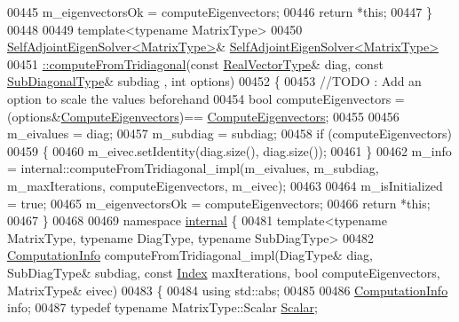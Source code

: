 \begin{DoxyCode}
00445   m\_eigenvectorsOk = computeEigenvectors;
00446   \textcolor{keywordflow}{return} *\textcolor{keyword}{this};
00447 \}
00448 
00449 \textcolor{keyword}{template}<\textcolor{keyword}{typename} MatrixType>
00450 \hyperlink{group___eigenvalues___module_class_eigen_1_1_self_adjoint_eigen_solver}{SelfAdjointEigenSolver<MatrixType>}& 
      \hyperlink{group___eigenvalues___module_a297893df7098c43278d385e4d4e23fe4}{SelfAdjointEigenSolver<MatrixType>}
00451 \hyperlink{group___eigenvalues___module_a297893df7098c43278d385e4d4e23fe4}{::computeFromTridiagonal}(\textcolor{keyword}{const} \hyperlink{class_eigen_1_1internal_1_1_tensor_lazy_evaluator_writable}{RealVectorType}& diag, \textcolor{keyword}{const} 
      \hyperlink{group___core___module_class_eigen_1_1_matrix}{SubDiagonalType}& subdiag , \textcolor{keywordtype}{int} options)
00452 \{
00453   \textcolor{comment}{//TODO : Add an option to scale the values beforehand}
00454   \textcolor{keywordtype}{bool} computeEigenvectors = (options&\hyperlink{group__enums_ggae3e239fb70022eb8747994cf5d68b4a9ada93d8885bde32b876ba4af01d3292cc}{ComputeEigenvectors})==
      \hyperlink{group__enums_ggae3e239fb70022eb8747994cf5d68b4a9ada93d8885bde32b876ba4af01d3292cc}{ComputeEigenvectors};
00455 
00456   m\_eivalues = diag;
00457   m\_subdiag = subdiag;
00458   \textcolor{keywordflow}{if} (computeEigenvectors)
00459   \{
00460     m\_eivec.setIdentity(diag.size(), diag.size());
00461   \}
00462   m\_info = internal::computeFromTridiagonal\_impl(m\_eivalues, m\_subdiag, m\_maxIterations, 
      computeEigenvectors, m\_eivec);
00463 
00464   m\_isInitialized = \textcolor{keyword}{true};
00465   m\_eigenvectorsOk = computeEigenvectors;
00466   \textcolor{keywordflow}{return} *\textcolor{keyword}{this};
00467 \}
00468 
00469 \textcolor{keyword}{namespace }\hyperlink{namespaceinternal}{internal} \{
00481 \textcolor{keyword}{template}<\textcolor{keyword}{typename} MatrixType, \textcolor{keyword}{typename} DiagType, \textcolor{keyword}{typename} SubDiagType>
00482 \hyperlink{group__enums_ga85fad7b87587764e5cf6b513a9e0ee5e}{ComputationInfo} computeFromTridiagonal\_impl(DiagType& diag, SubDiagType& subdiag, \textcolor{keyword}{const} 
      \hyperlink{group___eigenvalues___module_a8a59ab7734b6eae2754fd78bc7c3a360}{Index} maxIterations, \textcolor{keywordtype}{bool} computeEigenvectors, MatrixType& eivec)
00483 \{
00484   \textcolor{keyword}{using} std::abs;
00485 
00486   \hyperlink{group__enums_ga85fad7b87587764e5cf6b513a9e0ee5e}{ComputationInfo} info;
00487   \textcolor{keyword}{typedef} \textcolor{keyword}{typename} MatrixType::Scalar \hyperlink{group___eigenvalues___module_a0bfcedf4245b6846007ca4f01e4feb1f}{Scalar};

\end{DoxyCode}
